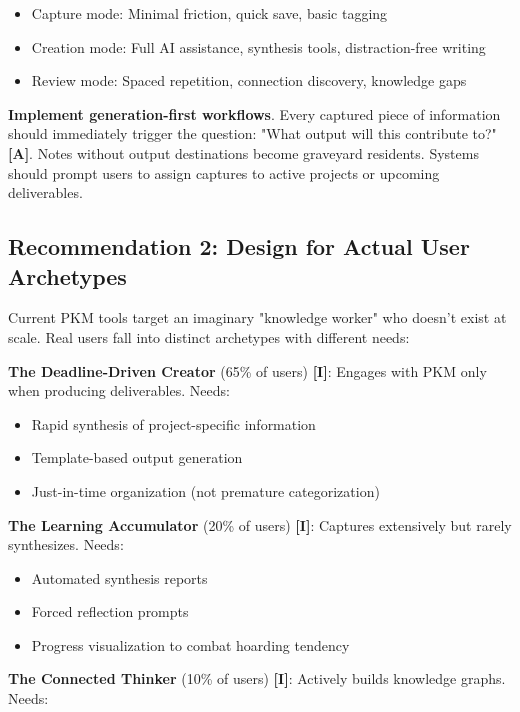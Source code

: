 \documentclass[a4paper,11pt]{article}
\newcommand{\ilabel}{\textbf{\textcolor{icolor}{[I]}}}
\newcommand{\alabel}{\textbf{\textcolor{acolor}{[A]}}}
\begin{document}
\begin{itemize}
  \item Capture mode: Minimal friction, quick save, basic tagging
  \item Creation mode: Full AI assistance, synthesis tools, distraction-free writing
  \item Review mode: Spaced repetition, connection discovery, knowledge gaps
\end{itemize}

\textbf{Implement generation-first workflows}. Every captured piece of information should immediately trigger the question: "What output will this contribute to?" \alabel{}. Notes without output destinations become graveyard residents. Systems should prompt users to assign captures to active projects or upcoming deliverables.


\subsection{Recommendation 2: Design for Actual User Archetypes}

Current PKM tools target an imaginary "knowledge worker" who doesn't exist at scale. Real users fall into distinct archetypes with different needs:


\textbf{The Deadline-Driven Creator} (65\% of users) \ilabel{}: Engages with PKM only when producing deliverables. Needs:

\begin{itemize}
  \item Rapid synthesis of project-specific information
  \item Template-based output generation
  \item Just-in-time organization (not premature categorization)
\end{itemize}

\textbf{The Learning Accumulator} (20\% of users) \ilabel{}: Captures extensively but rarely synthesizes. Needs:

\begin{itemize}
  \item Automated synthesis reports
  \item Forced reflection prompts
  \item Progress visualization to combat hoarding tendency
\end{itemize}

\textbf{The Connected Thinker} (10\% of users) \ilabel{}: Actively builds knowledge graphs. Needs:
\end{document}
